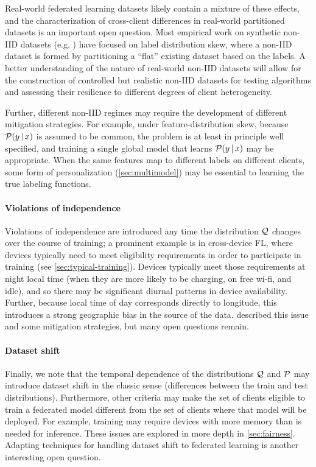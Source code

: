 \documentclass[11pt]{article}
\begin{document}
Real-world federated learning datasets likely contain a mixture of these effects, and the characterization of cross-client differences in real-world partitioned datasets is an important open question. Most empirical work on synthetic non-IID datasets (e.g. \citep{mcmahan17fedavg, hsieh2019noniid}) have focused on label distribution skew, where a non-IID dataset is formed by partitioning a ``flat'' existing dataset based on the labels. A better understanding of the nature of real-world non-IID datasets will allow for the construction of controlled but realistic non-IID datasets for testing algorithms and assessing their resilience to different degrees of client heterogeneity.

Further, different non-IID regimes may require the development of different mitigation strategies. For example, under feature-distribution skew, because $\mathcal{P}(y \,|\, x)$ is assumed to be common, the problem is at least in principle well specified, and training a single global model that learns $\mathcal{P}(y \,|\, x)$ may be appropriate. When the same features map to different labels on different clients, some form of personalization (\cref{sec:multimodel}) may be essential to learning the true labeling functions.


\paragraph{Violations of independence}
Violations of independence are introduced any time the distribution $\mathcal{Q}$ changes over the course of training; a prominent example is in cross-device FL, where devices typically need to meet eligibility requirements in order to participate in training (see \cref{sec:typical-training}). Devices typically meet those requirements at night local time (when they are more likely to be charging, on free wi-fi, and idle), and so there may be significant diurnal patterns in device availability. Further, because local time of day corresponds directly to longitude, this introduces a strong geographic bias in the source of the data. \citet{eichner19semicyclic} described this issue and some mitigation strategies, but many open questions remain.

\paragraph{Dataset shift}
Finally, we note that the temporal dependence of the distributions $\mathcal{Q}$ and $\mathcal{P}$ may introduce dataset shift in the classic sense (differences between the train and test distributions). Furthermore, other criteria may make the set of clients eligible to train a federated model different from the set of clients where that model will be deployed.  For example, training may require devices with more memory than is needed for inference. These issues are explored in more depth in \cref{sec:fairness}. Adapting techniques for handling dataset shift to federated learning is another interesting open question.
\end{document}
